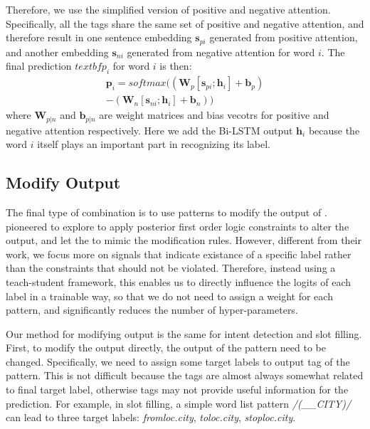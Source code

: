 Therefore, we use the simplified version of positive and negative attention. Specifically, all the tags share the same set of positive and negative attention, and therefore result in one sentence embedding $\textbf{s}_{pi}$ generated from positive attention, and another embedding $\textbf{s}_{ni}$ generated from negative attention for word $i$. The final prediction $textbf{p}_i$ for word $i$ is then:
\begin{equation}
\begin{split}
\textbf{p}_i = softmax((\textbf{W}_p [\textbf{s}_{pi}; \textbf{h}_i] + \textbf{b}_p) \\- (\textbf{W}_n [\textbf{s}_{ni}; \textbf{h}_i] + \textbf{b}_n))
\end{split} 
\end{equation} 
where $\textbf{W}_{p|n}$ and $\textbf{b}_{p|n}$ are weight matrices and bias vecotrs for positive and negative attention respectively. Here we add the Bi-LSTM output $\textbf{h}_i$ because the word $i$ itself plays an important part in recognizing its label.

\subsection{Modify Output}
The final type of combination is to use \RE patterns to modify the output of \NN. \cite{hu2016harnessing} pioneered to explore to apply posterior first order logic constraints to alter the \NN output, and let the \NN to mimic the modification rules. However, different from their work, we focus more on signals that indicate existance of a specific label rather than the constraints that should not be violated. Therefore, instead using a teach-student framework, this enables us to directly influence the logits of each label in a trainable way, so that we do not need to assign a weight for each pattern, and significantly reduces the number of hyper-parameters.

Our method for modifying output is the same for intent detection and slot filling.
First, to modify the output directly, the output of the \RE pattern need to be changed. Specifically, we need to assign some target labels to output tag of the \RE pattern. This is not difficult because the \RE tags are almost always somewhat related to final target label, otherwise \RE tags may not provide useful information for the prediction. For example, in slot filling, a simple word list pattern \textsl{/(\_\_CITY)/} can lead to three target labels: \emph{fromloc.city}, \emph{toloc.city}, \emph{stoploc.city}.


